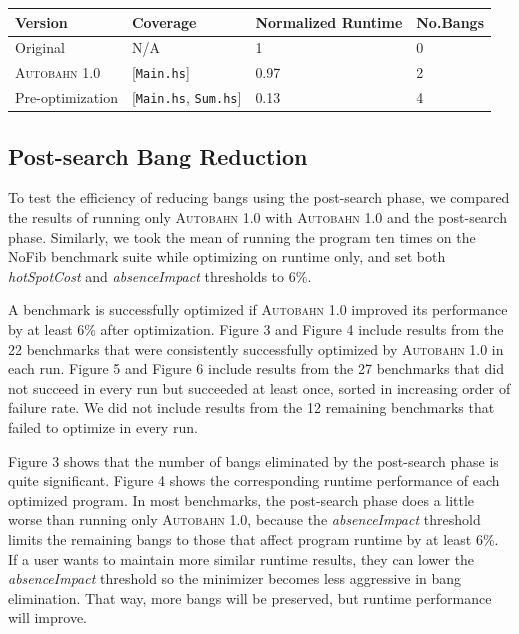\documentclass[format=sigplan, review=true]{acmart}
\newcommand{\hotspotcost}[0]{\textit{hotSpotCost}}
\newcommand{\Ao}[0]{\textsc{Autobahn 1.0}}
\newcommand{\postopt}[0]{post-search}
\newcommand{\Postopt}[0]{Post-search}
\newcommand{\absim}[0]{\textit{absenceImpact}}
\begin{document}
\begin{tabular}{p{2.5cm}p{1.5cm}p{2cm}p{1cm}}
\hline
Version   & Coverage & Normalized Runtime & No.Bangs \\
\hline
Original      & N/A   &   1	 & 0   \\
\Ao{}       & [\texttt{Main.hs}]      & 0.97    &  2\\
Pre-optimization	& [\texttt{Main.hs}, \texttt{Sum.hs}]         & 0.13      & 4\\
\hline
\end{tabular}


\subsection{\Postopt{} Bang Reduction}

To test the efficiency of reducing bangs using the \postopt{} phase, we compared the results of running only \Ao{} with \Ao{} and the \postopt{} phase. Similarly, we took the mean of running the program ten times on the NoFib benchmark suite while optimizing on runtime only, and set both \hotspotcost{} and \absim{} thresholds to 6\%. 


A benchmark is successfully optimized if \Ao{} improved its performance by at least 6\% after optimization. Figure 3 and Figure 4 include results from the 22 benchmarks that were consistently successfully optimized by \Ao{} in each run. Figure 5 and Figure 6 include results from the 27 benchmarks that did not succeed in every run but succeeded at least once, sorted in increasing order of failure rate. We did not include results from the 12 remaining benchmarks that failed to optimize in every run.

Figure 3 shows that the number of bangs eliminated by the \postopt{} phase is quite significant. Figure 4 shows the corresponding runtime performance of each optimized program. In most benchmarks, the \postopt{} phase does a little worse than running only \Ao{}, because the \absim{} threshold limits the remaining bangs to those that affect program runtime by at least 6\%. If a user wants to maintain more similar runtime results, they can lower the \absim{} threshold so the minimizer becomes less aggressive in bang elimination. That way, more bangs will be preserved, but runtime performance will improve. 
\end{document}
